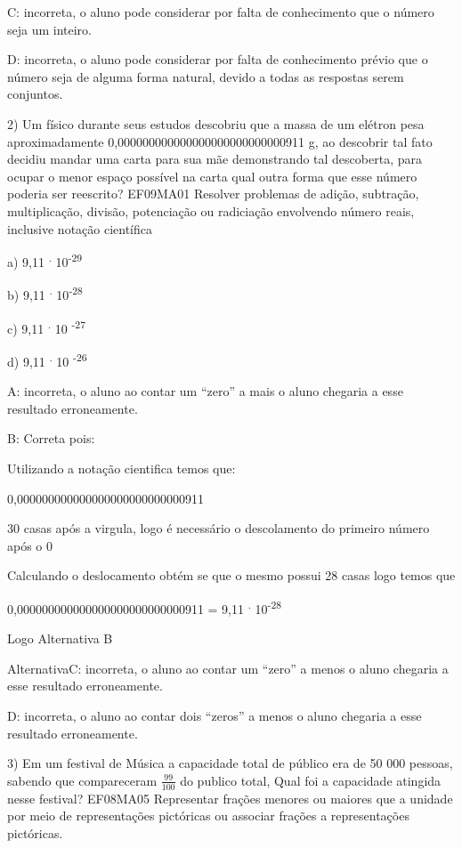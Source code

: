 {C: incorreta, o aluno pode considerar por falta de conhecimento que o
número seja um inteiro.

D: incorreta, o aluno pode considerar por falta de conhecimento prévio
que o número seja de alguma forma natural, devido a todas as respostas
serem conjuntos.

2) Um físico durante seus estudos descobriu que a massa de um elétron
pesa aproximadamente 0,000000000000000000000000000911 g, ao descobrir
tal fato decidiu mandar uma carta para sua mãe demonstrando tal
descoberta, para ocupar o menor espaço possível na carta qual outra
forma que esse número poderia ser reescrito? EF09MA01 Resolver problemas
de adição, subtração, multiplicação, divisão, potenciação ou radiciação
envolvendo número reais, inclusive notação científica

a) 9,11 \textsuperscript{.} 10\textsuperscript{-29}

b) 9,11 \textsuperscript{.} 10\textsuperscript{-28}

c) 9,11 \textsuperscript{.} 10 \textsuperscript{-27}

d) 9,11 \textsuperscript{.} 10 \textsuperscript{-26}

A: incorreta, o aluno ao contar um ``zero'' a mais o aluno chegaria a
esse resultado erroneamente.

B: Correta pois:

Utilizando a notação cientifica temos que:

0,000000000000000000000000000911

30 casas após a virgula, logo é necessário o descolamento do primeiro
número após o 0

Calculando o deslocamento obtém se que o mesmo possui 28 casas logo
temos que

0,000000000000000000000000000911 = 9,11 \textsuperscript{.}
10\textsuperscript{-28}

Logo Alternativa B

AlternativaC: incorreta, o aluno ao contar um ``zero'' a menos o aluno
chegaria a esse resultado erroneamente.

D: incorreta, o aluno ao contar dois ``zeros'' a menos o aluno chegaria
a esse resultado erroneamente.

3) Em um festival de Música a capacidade total de público era de 50 000
pessoas, sabendo que compareceram \(\frac{99}{100}\) do publico total,
Qual foi a capacidade atingida nesse festival? EF08MA05 Representar
frações menores ou maiores que a unidade por meio de representações
pictóricas ou associar frações a representações pictóricas.

}
